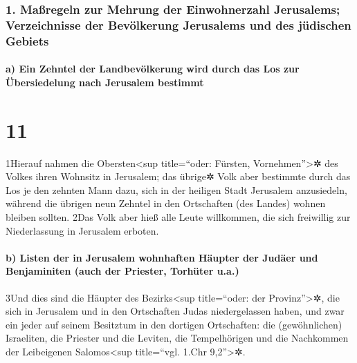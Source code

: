 \hypertarget{mauxdfregeln-zur-mehrung-der-einwohnerzahl-jerusalems-verzeichnisse-der-bevuxf6lkerung-jerusalems-und-des-juxfcdischen-gebiets}{%
\subsubsection{1. Maßregeln zur Mehrung der Einwohnerzahl Jerusalems;
Verzeichnisse der Bevölkerung Jerusalems und des jüdischen
Gebiets}\label{mauxdfregeln-zur-mehrung-der-einwohnerzahl-jerusalems-verzeichnisse-der-bevuxf6lkerung-jerusalems-und-des-juxfcdischen-gebiets}}

\hypertarget{a-ein-zehntel-der-landbevuxf6lkerung-wird-durch-das-los-zur-uxfcbersiedelung-nach-jerusalem-bestimmt}{%
\paragraph{a) Ein Zehntel der Landbevölkerung wird durch das Los zur
Übersiedelung nach Jerusalem
bestimmt}\label{a-ein-zehntel-der-landbevuxf6lkerung-wird-durch-das-los-zur-uxfcbersiedelung-nach-jerusalem-bestimmt}}

\hypertarget{section-10}{%
\section{11}\label{section-10}}

1Hierauf nahmen die Obersten\textless sup title=``oder: Fürsten,
Vornehmen''\textgreater✲ des Volkes ihren Wohnsitz in Jerusalem; das
übrige✲ Volk aber bestimmte durch das Los je den zehnten Mann dazu, sich
in der heiligen Stadt Jerusalem anzusiedeln, während die übrigen neun
Zehntel in den Ortschaften (des Landes) wohnen bleiben sollten. 2Das
Volk aber hieß alle Leute willkommen, die sich freiwillig zur
Niederlassung in Jerusalem erboten.

\hypertarget{b-listen-der-in-jerusalem-wohnhaften-huxe4upter-der-juduxe4er-und-benjaminiten-auch-der-priester-torhuxfcter-u.a.}{%
\paragraph{b) Listen der in Jerusalem wohnhaften Häupter der Judäer und
Benjaminiten (auch der Priester, Torhüter
u.a.)}\label{b-listen-der-in-jerusalem-wohnhaften-huxe4upter-der-juduxe4er-und-benjaminiten-auch-der-priester-torhuxfcter-u.a.}}

3Und dies sind die Häupter des Bezirks\textless sup title=``oder: der
Provinz''\textgreater✲, die sich in Jerusalem und in den Ortschaften
Judas niedergelassen haben, und zwar ein jeder auf seinem Besitztum in
den dortigen Ortschaften: die (gewöhnlichen) Israeliten, die Priester
und die Leviten, die Tempelhörigen und die Nachkommen der Leibeigenen
Salomos\textless sup title=``vgl. 1.Chr 9,2''\textgreater✲.

